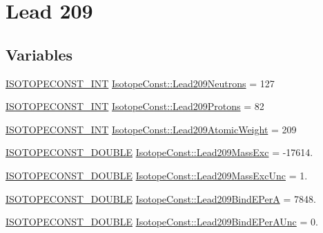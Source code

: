 \hypertarget{group___isotope_const-_lead-_pb209}{}\section{Lead 209}
\label{group___isotope_const-_lead-_pb209}
\subsection*{Variables}
\begin{DoxyCompactItemize}
\item 
\mbox{\hyperlink{group___isotope_const-_macros_ga5f18360b3e99483a35c32d789e62621c}{I\+S\+O\+T\+O\+P\+E\+C\+O\+N\+S\+T\+\_\+\+I\+NT}} \mbox{\hyperlink{group___isotope_const-_lead-_pb209_ga5a506f892c6509529b084bbe13d6b903}{Isotope\+Const\+::\+Lead209\+Neutrons}} = 127
\item 
\mbox{\hyperlink{group___isotope_const-_macros_ga5f18360b3e99483a35c32d789e62621c}{I\+S\+O\+T\+O\+P\+E\+C\+O\+N\+S\+T\+\_\+\+I\+NT}} \mbox{\hyperlink{group___isotope_const-_lead-_pb209_ga98066ad4e552c43efcebcf24bf568a39}{Isotope\+Const\+::\+Lead209\+Protons}} = 82
\item 
\mbox{\hyperlink{group___isotope_const-_macros_ga5f18360b3e99483a35c32d789e62621c}{I\+S\+O\+T\+O\+P\+E\+C\+O\+N\+S\+T\+\_\+\+I\+NT}} \mbox{\hyperlink{group___isotope_const-_lead-_pb209_ga1201c9620e878287c3bceda8becfe190}{Isotope\+Const\+::\+Lead209\+Atomic\+Weight}} = 209
\item 
\mbox{\hyperlink{group___isotope_const-_macros_ga8f45a7272ce02c0b4c65c44636ed719a}{I\+S\+O\+T\+O\+P\+E\+C\+O\+N\+S\+T\+\_\+\+D\+O\+U\+B\+LE}} \mbox{\hyperlink{group___isotope_const-_lead-_pb209_gaa8b6dfe7f61c1eca94d0c665c425fc21}{Isotope\+Const\+::\+Lead209\+Mass\+Exc}} = -\/17614.
\item 
\mbox{\hyperlink{group___isotope_const-_macros_ga8f45a7272ce02c0b4c65c44636ed719a}{I\+S\+O\+T\+O\+P\+E\+C\+O\+N\+S\+T\+\_\+\+D\+O\+U\+B\+LE}} \mbox{\hyperlink{group___isotope_const-_lead-_pb209_ga969da8fc0b1ebf9873c7d2709746d17e}{Isotope\+Const\+::\+Lead209\+Mass\+Exc\+Unc}} = 1.
\item 
\mbox{\hyperlink{group___isotope_const-_macros_ga8f45a7272ce02c0b4c65c44636ed719a}{I\+S\+O\+T\+O\+P\+E\+C\+O\+N\+S\+T\+\_\+\+D\+O\+U\+B\+LE}} \mbox{\hyperlink{group___isotope_const-_lead-_pb209_ga039616d45cb7ad98759909fc31855d0c}{Isotope\+Const\+::\+Lead209\+Bind\+E\+PerA}} = 7848.
\item 
\mbox{\hyperlink{group___isotope_const-_macros_ga8f45a7272ce02c0b4c65c44636ed719a}{I\+S\+O\+T\+O\+P\+E\+C\+O\+N\+S\+T\+\_\+\+D\+O\+U\+B\+LE}} \mbox{\hyperlink{group___isotope_const-_lead-_pb209_gadfa570b635b3c0a7ea2464fda08553b7}{Isotope\+Const\+::\+Lead209\+Bind\+E\+Per\+A\+Unc}} = 0.

\end{DoxyCompactItemize}
